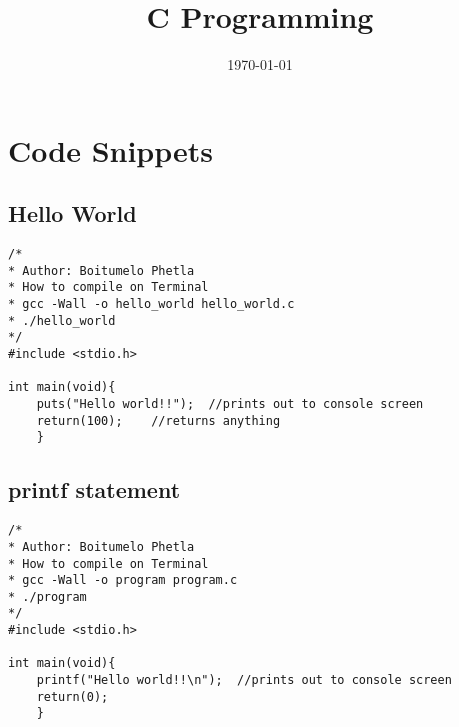 \documentclass[10pt, a4paper, twocolumn]{article} %
\title{C Programming} %
\author{
	\authorstyle{Boitumelo Phetla} %
}
\date{\today} %
\begin{document}
\maketitle %

\thispagestyle{firstpage} %




\section{Code Snippets}

\subsection{Hello World}

\begin{lstlisting}
/*
* Author: Boitumelo Phetla
* How to compile on Terminal
* gcc -Wall -o hello_world hello_world.c
* ./hello_world
*/
#include <stdio.h>

int main(void){
	puts("Hello world!!");	//prints out to console screen
	return(100);	//returns anything
	}

\end{lstlisting}

\subsection{printf statement}

\begin{lstlisting}
/*
* Author: Boitumelo Phetla
* How to compile on Terminal
* gcc -Wall -o program program.c
* ./program
*/
#include <stdio.h>

int main(void){
	printf("Hello world!!\n");	//prints out to console screen
	return(0);
	}
\end{lstlisting}
\end{document}
